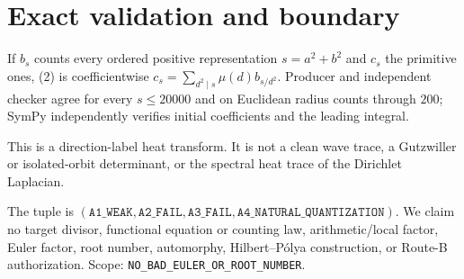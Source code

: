 \documentclass[10pt]{article}
\begin{document}
\section{Exact validation and boundary}
If $b_s$ counts every ordered positive representation $s=a^2+b^2$ and
$c_s$ the primitive ones, (2) is coefficientwise
$c_s=\sum_{d^2\mid s}\mu(d)b_{s/d^2}$.  Producer and independent checker
agree for every $s\leq20000$ and on Euclidean radius counts through $200$;
SymPy independently verifies initial coefficients and the leading integral.

This is a direction-label heat transform.  It is not a clean wave trace, a
Gutzwiller or isolated-orbit determinant, or the spectral heat trace of the
Dirichlet Laplacian.

The tuple is
$(\texttt{A1\_WEAK},\texttt{A2\_FAIL},\texttt{A3\_FAIL},
\texttt{A4\_NATURAL\_QUANTIZATION})$.  We claim no target divisor,
functional equation or counting law, arithmetic/local factor, Euler factor,
root number, automorphy, Hilbert--P\'olya construction, or Route-B
authorization.  Scope: \texttt{NO\_BAD\_EULER\_OR\_ROOT\_NUMBER}.
\end{document}
